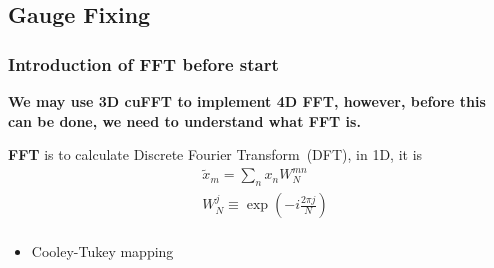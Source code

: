 \subsection{\label{sec:GaugeFixing}Gauge Fixing}

\subsubsection{\label{sec:FFT}Introduction of FFT before start}

\textbf{We may use 3D cuFFT to implement 4D FFT, however, before this can be done, we need to understand what FFT is.}

\textbf{FFT} is to calculate Discrete Fourier Transform~(DFT), in 1D, it is
\begin{equation}
\begin{split}
&\tilde{x}_m=\sum _n x_nW_N^{mn}\\
&W_N^j\equiv \exp (-i\frac{2\pi j}{N})\\
\end{split}
\end{equation}

\begin{itemize}
  \item Cooley-Tukey mapping
\end{itemize}

